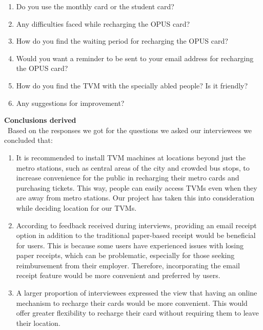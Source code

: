 \documentclass{article}
\begin{document}
{\begin{enumerate}
\item Do you use the monthly card or the student card?
\item Any difficulties faced while recharging the OPUS card?
\item How do you find the waiting period for recharging the OPUS card?
\item Would you want a reminder to be sent to your email address for
recharging the OPUS card?
\item How do you find the TVM with the specially abled people? Is it friendly?
\item Any suggestions for improvement?
\end{enumerate}
\textbf{Conclusions derived}
\\\
Based on the responses we got for the questions we asked our interviewees
we concluded that:
\begin{enumerate}
\item It is recommended to install TVM machines at locations beyond just the metro stations, such as central areas of the city and crowded bus stops, to increase convenience for the public in recharging their metro cards and purchasing tickets. This way, people can easily access TVMs even when they are away from metro stations. Our project has taken this into consideration while deciding location for our TVMs.
\item According to feedback received during interviews, providing an email receipt option in addition to the traditional paper-based receipt would be beneficial for users. This is because some users have experienced issues with losing paper receipts, which can be problematic, especially for those seeking reimbursement from their employer. Therefore, incorporating the email receipt feature would be more convenient and preferred by users.
\item A larger proportion of interviewees expressed the view that having an online mechanism to recharge their cards would be more convenient. This would offer greater flexibility to recharge their card without requiring them to leave their location.
\end{enumerate}
}
\end{document}
